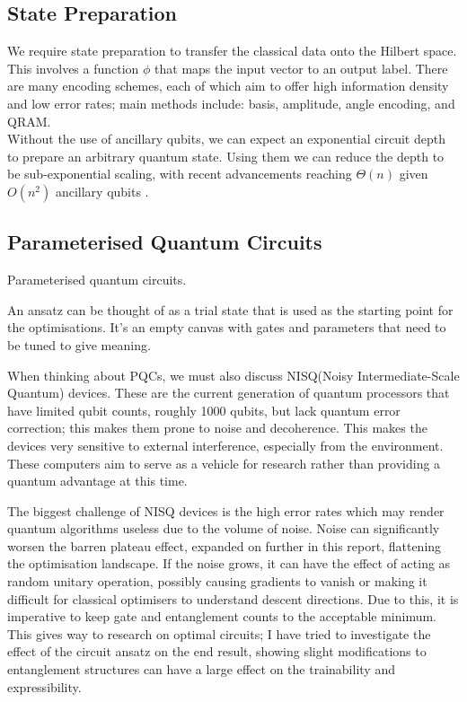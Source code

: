 \documentclass[12pt]{article}
\newcommand{\newp}
    {
    \vskip 0.5cm 
  }
\numberwithin{equation}{section}
\begin{document}
\subsection{State Preparation}
We require state preparation to transfer the classical data onto the 
Hilbert space. This involves a function $\phi$ that maps the input vector to 
an output label. There are many encoding schemes, each of which aim to offer 
high information density and low error rates; main methods include: basis, amplitude,
angle encoding, and QRAM. 
\\
Without the use of ancillary qubits, we can expect an exponential circuit depth
to prepare an arbitrary quantum state. Using them we can reduce the depth to be 
sub-exponential scaling, with recent advancements reaching $\Theta(n)$ given $O(n^2)$
ancillary qubits
\cite{shaib_efficient_2023,zhang_quantum_2022}.



\subsection{Parameterised Quantum Circuits}
Parameterised quantum circuits.
\newp
An ansatz can be thought of as a trial state that is used as the starting point 
for the optimisations. It's an empty canvas with gates and parameters that need 
to be tuned to give meaning.
\newp 
When thinking about PQCs, we must also discuss NISQ(Noisy Intermediate-Scale 
Quantum) devices. These are the current generation of quantum processors that 
have limited qubit counts, roughly 1000 qubits, but lack quantum error correction; 
this makes them prone to noise and decoherence. This makes the devices very sensitive 
to external interference, especially from the environment. These computers aim 
to serve as a vehicle for research rather than providing a quantum advantage 
at this time.
\newp
The biggest challenge of NISQ devices is the high error rates which may render 
quantum algorithms useless due to the volume of noise. Noise can significantly 
worsen the barren plateau effect, expanded on further in this report, flattening 
the optimisation landscape. If the noise grows, it can have the effect of acting 
as random unitary operation, possibly causing gradients to vanish or making it 
difficult for classical optimisers to understand descent directions. 
Due to this, it is imperative to keep gate and entanglement counts to the acceptable 
minimum. This gives way to research on optimal circuits; I have tried to investigate 
the effect of the circuit ansatz on the end result, showing slight modifications 
to entanglement structures can have a large effect on the trainability and 
expressibility. 
\end{document}
